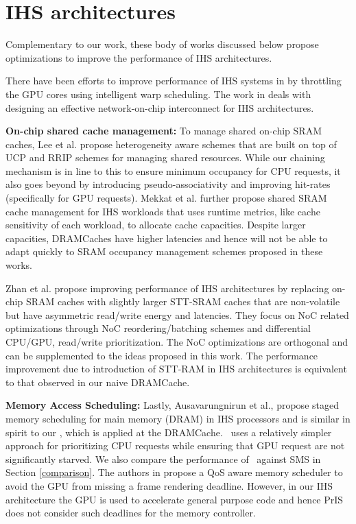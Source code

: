 \section{IHS architectures}
Complementary to our work, these body of works discussed below propose optimizations to improve the performance of IHS architectures. 
\par There have been efforts to improve performance of IHS systems in \cite{gpu-concurrency} by throttling the GPU cores using intelligent warp scheduling. The work in \cite{interconnect} deals with designing an effective network-on-chip interconnect for IHS architectures. 
\par \textbf{On-chip shared cache management:} To manage shared on-chip SRAM caches, Lee et al. \cite{tap}  propose heterogeneity aware schemes that are built on top of UCP and RRIP schemes for managing shared resources. While our chaining mechanism is in line to this to ensure minimum occupancy for CPU requests, it also goes beyond by introducing pseudo-associativity and improving hit-rates (specifically for GPU requests). Mekkat et al. \cite{helm} further propose shared SRAM cache management for IHS workloads that uses runtime metrics, like cache sensitivity of each workload, to allocate cache capacities. Despite larger capacities, DRAMCaches have higher latencies and hence will not be able to adapt quickly to SRAM occupancy management schemes proposed in these works. 
\par Zhan et al. \cite{oscar} propose improving performance of IHS architectures by replacing on-chip SRAM caches with slightly larger STT-SRAM caches that are non-volatile but have asymmetric read/write energy and latencies. They focus on NoC related optimizations through NoC reordering/batching schemes and differential CPU/GPU, read/write prioritization. The NoC optimizations are orthogonal and can be supplemented to the ideas proposed in this work. The performance improvement due to introduction of STT-RAM in IHS architectures is equivalent to that observed in our naive DRAMCache.
\par \textbf{Memory Access Scheduling:} Lastly, Ausavarungnirun et al., \cite{sms} propose staged memory scheduling for main memory (DRAM) in IHS processors and is similar in spirit to our \prioname, which is applied at the DRAMCache. \prioname\ uses a relatively simpler approach for prioritizing CPU requests while ensuring that GPU request are not significantly starved. We also compare the performance of \cachename\ against SMS in Section \ref{comparison}. The authors in \cite{qos-aware} propose a QoS aware memory scheduler to avoid the GPU from missing a
frame rendering deadline. However, in our IHS architecture the GPU is used to accelerate general
purpose code and hence PrIS does not consider such deadlines for the memory controller.

